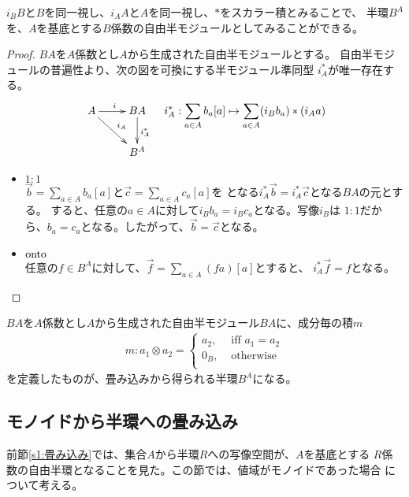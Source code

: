 		$i_BB$と$B$を同一視し、$i_AA$と$A$を同一視し、$*$をスカラー積とみることで、
		半環$B^A$を、$A$を基底とする$B$係数の自由半モジュールとしてみることができる。
		\begin{proof} %
			$BA$を$A$係数とし$A$から生成された自由半モジュールとする。
			自由半モジュールの普遍性より、次の図を可換にする半モジュール準同型
			$i_A^*$が唯一存在する。
			\begin{equation}\xymatrix{
				A \ar[r]^{i} \ar[dr]^{i_A} & BA \ar[d]^{i_A^*} \\
				& B^A \\
			} \quad i_A^*: \sum_{a\in A}b_a[a] \mapsto \sum_{a\in A}(i_Bb_a)*(i_Aa)
			\end{equation}
			\begin{itemize}
				\item $1:1$ \\
				$\vec{b}=\sum_{a\in A}b_a[a]$と$\vec{c}=\sum_{a\in A}c_a[a]$を
				となる$i_A^*\vec{b}=i_A^*\vec{c}$となる$BA$の元とする。
				すると、任意の$a\in A$に対して$i_Bb_a=i_Bc_a$となる。写像$i_B$は
				$1:1$だから、$b_a=c_a$となる。したがって、$\vec{b}=\vec{c}$となる。
				\item $\operatorname{onto}$ \\
				任意の$f\in B^A$に対して、$\vec{f}=\sum_{a\in A}(fa)[a]$とすると、
				$i_A^*\vec{f}=f$となる。
			\end{itemize}
		\end{proof} %

		$BA$を$A$係数とし$A$から生成された自由半モジュール$BA$に、成分毎の積$m$
		\begin{equation}\begin{split} %
			m: a_1\otimes a_2 = \begin{cases}
				a_2, &\text{ iff }a_1=a_2 \\
				0_B, &\text{ otherwise } \\
			\end{cases}
		\end{split}\end{equation} %
		を定義したものが、畳み込みから得られる半環$B^A$になる。

	\subsection{モノイドから半環への畳み込み}\label{s2:モノイドから半環への畳み込み} %
		前節\ref{s1:畳み込み}では、集合$A$から半環$R$への写像空間が、$A$を基底とする
		$R$係数の自由半環となることを見た。この節では、値域がモノイドであった場合
		について考える。


